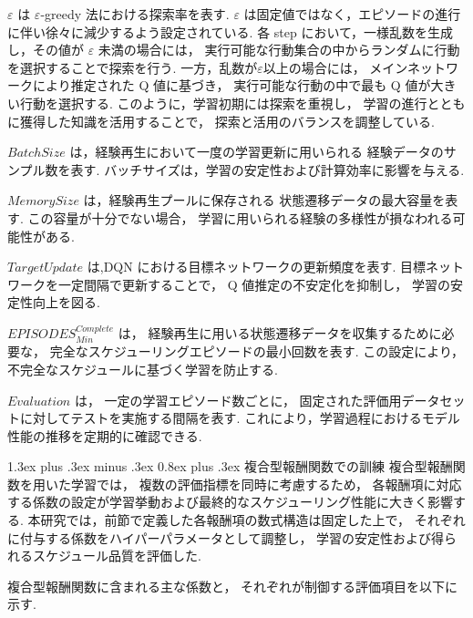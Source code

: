 \documentclass{jarticle}
\makeatletter
\renewcommand{\subsubsection}{%
  \@startsection{subsubsection}{3}{\z@}%
  {1.3ex plus .3ex minus .3ex}%
  {0.8ex plus .3ex}%
  {\LARGE\bfseries}%
}
\makeatother
\begin{document}
$\varepsilon$ は $\varepsilon$-greedy 法における探索率を表す.
$\varepsilon$ は固定値ではなく，エピソードの進行に伴い徐々に減少するよう設定されている.
各 step において，一様乱数を生成し，その値が $\varepsilon$ 未満の場合には，
実行可能な行動集合の中からランダムに行動を選択することで探索を行う.
一方，乱数が$\varepsilon$以上の場合には，
メインネットワークにより推定された Q 値に基づき，
実行可能な行動の中で最も Q 値が大きい行動を選択する.
このように，学習初期には探索を重視し，
学習の進行とともに獲得した知識を活用することで，
探索と活用のバランスを調整している.

$BatchSize$ は，経験再生において一度の学習更新に用いられる
経験データのサンプル数を表す.
バッチサイズは，学習の安定性および計算効率に影響を与える.

$MemorySize$ は，経験再生プールに保存される
状態遷移データの最大容量を表す.
この容量が十分でない場合，
学習に用いられる経験の多様性が損なわれる可能性がある.

$TargetUpdate$ は,DQN における目標ネットワークの更新頻度を表す.
目標ネットワークを一定間隔で更新することで，
Q 値推定の不安定化を抑制し，
学習の安定性向上を図る.

${EPISODES}^{Complete}_{Min}$ は，
経験再生に用いる状態遷移データを収集するために必要な，
完全なスケジューリングエピソードの最小回数を表す.
この設定により，
不完全なスケジュールに基づく学習を防止する.

$Evaluation$ は，
一定の学習エピソード数ごとに，
固定された評価用データセットに対してテストを実施する間隔を表す.
これにより，学習過程におけるモデル性能の推移を定期的に確認できる.

\subsubsection{複合型報酬関数での訓練}
複合型報酬関数を用いた学習では，
複数の評価指標を同時に考慮するため，
各報酬項に対応する係数の設定が学習挙動および最終的なスケジューリング性能に大きく影響する.
本研究では，前節で定義した各報酬項の数式構造は固定した上で，
それぞれに付与する係数をハイパーパラメータとして調整し，
学習の安定性および得られるスケジュール品質を評価した.

複合型報酬関数に含まれる主な係数と，
それぞれが制御する評価項目を以下に示す.
\end{document}
